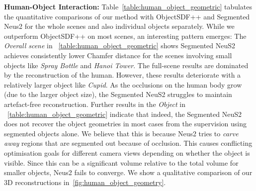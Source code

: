 \textbf{Human-Object Interaction:} Table~\ref{table:human_object_geometric} tabulates the quantitative comparisons of our method with ObjectSDF++ and Segmented Neus2 for the whole scenes and also individual objects separately. 
While we outperform ObjectSDF++ on most scenes, an interesting pattern emerges: 
The \textit{Overall scene} in ~\cref{table:human_object_geometric} shows Segmented NeuS2 achieves consistently lower Chamfer distance for the scenes involving small objects like \textit{Spray Bottle} and \textit{Hanoi Tower}. 
The full-scene results are dominated by the reconstruction of the human. 
However, these results deteriorate 
with a relatively larger object like \textit{Cupid}. 
As the occlusions on the human body grow (due to the larger object size), the Segmented NeuS2 struggles to maintain artefact-free reconstruction. 
Further results in the \textit{Object} in ~\cref{table:human_object_geometric} indicate that indeed, the Segmented NeuS2 does not recover the object geometries in most cases from the supervision using segmented objects alone.
We believe that this is because Neus2 tries to \textit{carve away} regions that are segmented out because of occlusion. This causes conflicting optimisation goals for different camera views depending on whether the object is visible. Since this can be a significant volume relative to the total volume for smaller objects, Neus2 fails to converge.
We show a qualitative comparison of our 3D reconstructions in~\cref{fig:human_object_geometry}.
